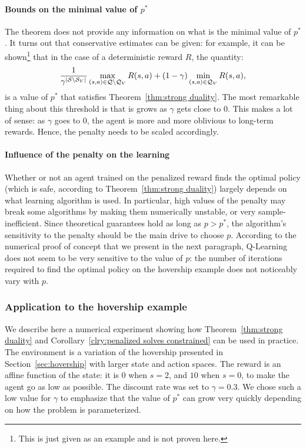 \paragraph{Bounds on the minimal value of $p^*$} The theorem does not provide any information on what is the minimal value of $p^*$. It turns out that conservative estimates can be given: for example, it can be shown\footnote{This is just given as an example and is not proven here.} that in the case of a deterministic reward $R$, the quantity: 
$$
	\frac{1}{\gamma^{|\mathcal{S}\setminus{\ensuremath{\mathcal{S}}_{V}}|}}\max_{(s,a)\in\mathcal{Q}\setminus\mathcal{Q}_{V}}R(s, a) + (1 - \gamma)\min_{(s, a)\in\mathcal{Q}_{V}}R(s, a),
$$
is a value of $p^*$ that satisfies Theorem~\ref{thm:strong duality}. The most remarkable thing about this threshold is that is grows as $\gamma$ gets close to $0$. This makes a lot of sense: as $\gamma$ goes to $0$, the agent is more and more oblivious to long-term rewards. Hence, the penalty needs to be scaled accordingly.

\paragraph{Influence of the penalty on the learning} Whether or not an agent trained on the penalized reward finds the optimal policy (which is safe, according to Theorem~\ref{thm:strong duality}) largely depends on what learning algorithm is used. In particular, high values of the penalty may break some algorithms by making them numerically unstable, or very sample-inefficient. Since theoretical guarantees hold as long as $p > p^*$, the algorithm's sensitivity to the penalty should be the main drive to choose $p$. According to the numerical proof of concept that we present in the next paragraph, Q-Learning does not seem to be very sensitive to the value of $p$: the number of iterations required to find the optimal policy on the hovership example does not noticeably vary with $p$.

\subsubsection{Application to the hovership example} \label{sec:hovership example}
We describe here a numerical experiment showing how Theorem~\ref{thm:strong duality} and Corollary~\ref{clry:penalized solves constrained} can be used in practice. The environment is a variation of the hovership presented in Section~\ref{sec:hovership} with larger state and action spaces. The reward is an affine function of the state: it is $0$ when $s=2$, and $10$ when $s=0$, to make the agent go as low as possible. The discount rate was set to $\gamma = 0.3$. We chose such a low value for $\gamma$ to emphasize that the value of $p^*$ can grow very quickly depending on how the problem is parameterized.

